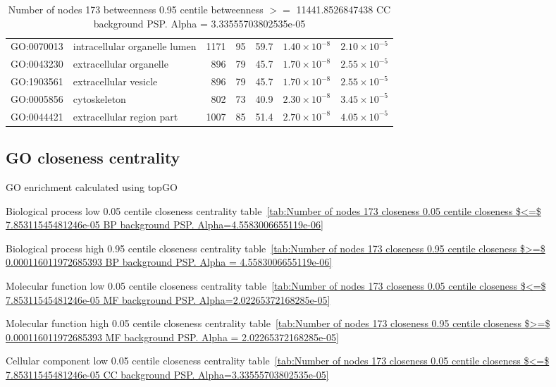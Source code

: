 \begin{table}[ht]
\begin{adjustbox}{max width=\textwidth}
\begin{tabular}{llrrrrr}
  GO:0070013 & intracellular organelle lumen & 1171 & 95 & 59.7 & $1.40 \times 10^{-8}$ & $2.10 \times 10^{-5}$ \\ 
  GO:0043230 & extracellular organelle & 896 & 79 & 45.7 & $1.70 \times 10^{-8}$ & $2.55 \times 10^{-5}$ \\ 
  GO:1903561 & extracellular vesicle & 896 & 79 & 45.7 & $1.70 \times 10^{-8}$ & $2.55 \times 10^{-5}$ \\ 
  GO:0005856 & cytoskeleton & 802 & 73 & 40.9 & $2.30 \times 10^{-8}$ & $3.45 \times 10^{-5}$ \\ 
  GO:0044421 & extracellular region part & 1007 & 85 & 51.4 & $2.70 \times 10^{-8}$ & $4.05 \times 10^{-5}$ \\ 
   \hline
\end{tabular}
\end{adjustbox}
\caption{Number of nodes 173 betweenness 0.95 centile  betweenness $>=$ 11441.8526847438 CC background PSP. Alpha = 3.33555703802535e-05} 
\label{tab:Number of nodes 173 betweenness 0.95 centile  betweenness $>=$ 11441.8526847438 CC background PSP. Alpha = 3.33555703802535e-05}
\end{table}



\subsection{GO closeness centrality}

GO enrichment calculated using topGO

Biological process low 0.05 centile closeness centrality table~\ref{tab:Number of nodes 173 closeness 0.05 centile  closeness $<=$ 7.85311545481246e-05 BP background PSP. Alpha=4.5583006655119e-06}

Biological process high 0.95 centile closeness centrality table~\ref{tab:Number of nodes 173 closeness 0.95 centile  closeness $>=$ 0.000116011972685393 BP background PSP. Alpha = 4.5583006655119e-06}

Molecular function low 0.05 centile closeness centrality table~\ref{tab:Number of nodes 173 closeness 0.05 centile  closeness $<=$ 7.85311545481246e-05 MF background PSP. Alpha=2.02265372168285e-05}

Molecular function high 0.05 centile closeness centrality table~\ref{tab:Number of nodes 173 closeness 0.95 centile  closeness $>=$ 0.000116011972685393 MF background PSP. Alpha = 2.02265372168285e-05}

Cellular component low 0.05 centile closeness centrality table~\ref{tab:Number of nodes 173 closeness 0.05 centile  closeness $<=$ 7.85311545481246e-05 CC background PSP. Alpha=3.33555703802535e-05}

